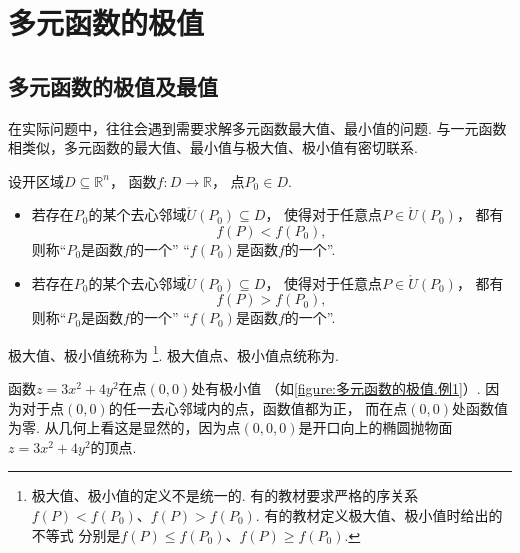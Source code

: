 \section{多元函数的极值}
\subsection{多元函数的极值及最值}
在实际问题中，往往会遇到需要求解多元函数最大值、最小值的问题.
与一元函数相类似，多元函数的最大值、最小值与极大值、极小值有密切联系.

\begin{definition}
设开区域\(D \subseteq \mathbb{R}^n\)，
函数\(f\colon D \to \mathbb{R}\)，
点\(P_0 \in D\).
\begin{itemize}
	\item 若存在\(P_0\)的某个去心邻域\(\mathring{U}(P_0) \subseteq D\)，
	使得对于任意点\(P \in \mathring{U}(P_0)\)，
	都有\begin{equation*}
		f(P) < f(P_0),
	\end{equation*}
	则称“\(P_0\)是函数\(f\)的一个”
	“\(f(P_0)\)是函数\(f\)的一个”.

	\item 若存在\(P_0\)的某个去心邻域\(\mathring{U}(P_0) \subseteq D\)，
	使得对于任意点\(P \in \mathring{U}(P_0)\)，
	都有\begin{equation*}
		f(P) > f(P_0),
	\end{equation*}
	则称“\(P_0\)是函数\(f\)的一个”
	“\(f(P_0)\)是函数\(f\)的一个”.
\end{itemize}

极大值、极小值统称为%
\footnote{极大值、极小值的定义不是统一的.
有的教材要求严格的序关系\(f(P) < f(P_0)\)、\(f(P) > f(P_0)\).
有的教材定义极大值、极小值时给出的不等式
分别是\(f(P) \leq f(P_0)\)、\(f(P) \geq f(P_0)\).}.
极大值点、极小值点统称为.
\end{definition}

\begin{example}%
函数\(z=3x^2+4y^2\)在点\((0,0)\)处有极小值
（如\cref{figure:多元函数的极值.例1}）.
因为对于点\((0,0)\)的任一去心邻域内的点，函数值都为正，
而在点\((0,0)\)处函数值为零.
从几何上看这是显然的，因为点\((0,0,0)\)是开口向上的椭圆抛物面\(z=3x^2+4y^2\)的顶点.
\end{example}

